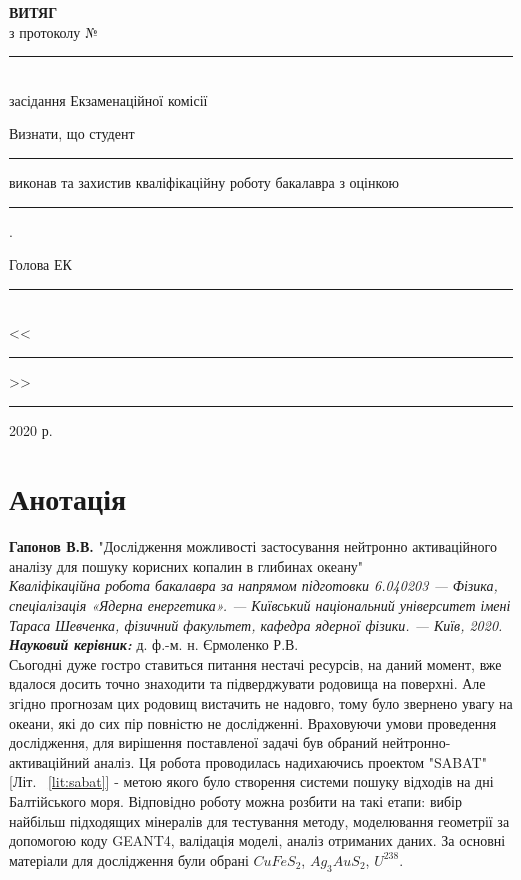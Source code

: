 \documentclass[a4paper, 14pt]{article}
\numberwithin{equation}{section}
\numberwithin{table}{section}
\begin{document}
	\begin{titlepage}
		\renewcommand{\baselinestretch}{1.0}
		\newcommand{\ul}[1]{\rule{#1}{0.1pt}}
		\begin{spacing}{1.8}
			\vspace*{4.5cm}
			{\center
				{\bf ВИТЯГ}\\
				з протоколу № \ul{2.4cm}\\
				засідання Екзаменаційної комісії\\[2cm]}
			{\noindent
				Визнати, що студент \ul{7.2cm} виконав та захистив кваліфікаційну роботу бакалавра з оцінкою \ul{7.2cm} .\\[1cm]}
			{\flushright
				Голова ЕК \ul{7.8cm}\\
				<<\ul{1cm}>> \ul{4cm} 2020 р.\\}
		\end{spacing}
	\end{titlepage}
	
	
	\pagestyle{empty}
	
	\section*{Анотація}
	
	{\bf Гапонов В.В.} "Дослідження можливості застосування нейтронно активаційного аналізу для пошуку корисних копалин в глибинах океану"\\
	{\itshape Кваліфікаційна робота бакалавра за напрямом підготовки 6.040203 --- Фізика, спеціалізація «Ядерна енергетика». --- Київський національний університет імені Тараса Шевченка, фізичний факультет, кафедра ядерної фізики. --- Київ, 2020.} \\
	{\itshape \bfseries Науковий керівник:} д. ф.-м. н. Єрмоленко Р.В.%
	\\[0.5cm]
	Сьогодні дуже гостро ставиться питання нестачі ресурсів, на даний момент, вже вдалося досить точно знаходити та підверджувати родовища на поверхні. Але згідно прогнозам цих родовищ вистачить не надовго, тому було звернено увагу на океани, які до сих пір повністю не дослідженні. 
	Враховуючи умови проведення дослідження, для вирішення поставленої задачі був обраний нейтронно-активаційний аналіз. Ця робота проводилась надихаючись проектом "SABAT" [Літ. ~\ref{lit:sabat}] - метою якого було створення системи пошуку відходів на дні Балтійського моря. Відповідно роботу можна розбити на такі етапи: вибір найбільш підходящих мінералів для тестування методу, моделювання геометрії за допомогою коду GEANT4, валідація моделі, аналіз отриманих даних. За основні матеріали для дослідження були обрані $CuFeS_2$, $Ag_3AuS_2$, $U^{238}$. 
	
\end{document}
